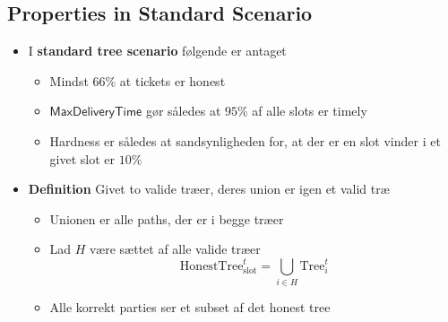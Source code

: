 \documentclass[a4, english]{article}
\begin{document}
\subsection{Properties in Standard Scenario}
\begin{itemize}
	\item I \textbf{standard tree scenario} følgende er antaget
  \begin{itemize}
  	\item Mindst $66\%$ at tickets er honest  
    \item $\mathsf{MaxDeliveryTime}$ gør således at $95\%$ af alle slots er timely
    \item Hardness er således at sandsynligheden for, at der er en slot vinder i et givet slot er $10\%$ 
  \end{itemize}
  \item \textbf{Definition} Givet to valide træer, deres union er igen et valid træ
  \begin{itemize}
    \item Unionen er alle paths, der er i begge træer
  	\item Lad $H$ være sættet af alle valide træer 
    \begin{equation*}
      \text{HonestTree}^t_\text{slot} = \bigcup_{i\in H} \text{Tree}_i^t
    \end{equation*}
    \item Alle korrekt parties ser et subset af det honest tree  
  \end{itemize}
\end{itemize}
\end{document}
